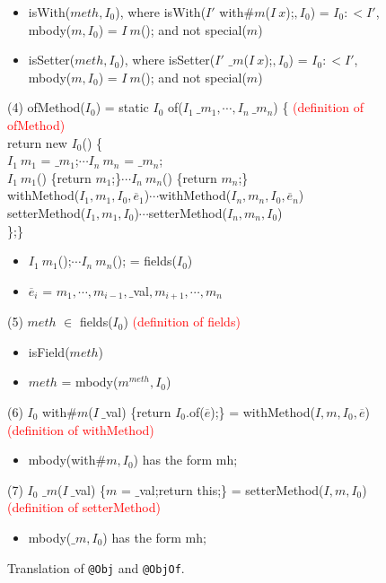 \begin{figure*}
\begin{itemize}
    \item \textsf{isWith(}$meth,I_0$\textsf{)}, where \textsf{isWith(}$I'$ \textsf{with}$\#m$\textsf{(}$I\ x$\textsf{);}$,I_0$\textsf{)} = $I_0 :< I'$, \textsf{mbody(}$m,I_0$\textsf{)} = $I\ m$\textsf{();} and not \textsf{special(}$m$\textsf{)}
    \item \textsf{isSetter(}$meth,I_0$\textsf{)}, where \textsf{isSetter(}$I'$ $\_m$\textsf{(}$I\ x$\textsf{);}$,I_0$\textsf{)} = $I_0 :< I'$, \textsf{mbody(}$m,I_0$\textsf{)} = $I\ m$\textsf{();} and not \textsf{special(}$m$\textsf{)}
    \end{itemize}
(4) \textsf{ofMethod(}$I_0$\textsf{)} = \textsf{static }$I_0$\textsf{ of(}$I_1\ \_m_1,\cdots,I_n\ \_m_n$\textsf{) \{} \textcolor{red}{(definition of ofMethod)}
    \\ \textsf{return new }$I_0$\textsf{() \{}
    \\ $I_1\ m_1$ = $\_m_1$\textsf{;}$\cdots I_n\ m_n$ = $\_m_n$\textsf{;}
    \\ $I_1\ m_1$\textsf{() \{return }$m_1$\textsf{;\}}$\cdots I_n\ m_n$\textsf{() \{return }$m_n$\textsf{;\}}
    \\ \textsf{withMethod(}$I_1,m_1,I_0,\overline{e}_1$\textsf{)}$\cdots$\textsf{withMethod(}$I_n,m_n,I_0,\overline{e}_n$\textsf{)}
    \\ \textsf{setterMethod(}$I_1,m_1,I_0$\textsf{)}$\cdots$\textsf{setterMethod(}$I_n,m_n,I_0$\textsf{)}
    \\ \textsf{\};\}}
    \begin{itemize}
    \item $I_1\ m_1$\textsf{();}$\cdots I_n\ m_n$\textsf{();} = \textsf{fields(}$I_0$\textsf{)}
    \item $\overline{e}_i$ = $m_1,\cdots,m_{i-1},\_$\textsf{val}$,m_{i+1},\cdots,m_n$
    \end{itemize}
(5) $meth$ $\in$ \textsf{fields(}$I_0$\textsf{)} \textcolor{red}{(definition of fields)}
    \begin{itemize}
    \item \textsf{isField(}$meth$\textsf{)}
    \item $meth$ = \textsf{mbody(}$m^{meth},I_0$\textsf{)}
    \end{itemize}
(6) $I_0$ \textsf{with}$\#m$\textsf{(}$I\ \_$\textsf{val) \{return }$I_0$\textsf{.of(}$\overline{e}$\textsf{);\}} = \textsf{withMethod(}$I,m,I_0,\overline{e}$\textsf{)} \textcolor{red}{(definition of withMethod)}
    \begin{itemize}
    \item \textsf{mbody(with}$\#m,I_0$\textsf{)} has the form \textsf{mh;}
    \end{itemize}
(7) $I_0$ $\_m$\textsf{(}$I\ \_$\textsf{val) \{}$m$ = $\_$\textsf{val;return this;\}} = \textsf{setterMethod(}$I,m,I_0$\textsf{)} \textcolor{red}{(definition of setterMethod)}
    \begin{itemize}
    \item \textsf{mbody(}$\_m,I_0$\textsf{)} has the form \textsf{mh;}
    \end{itemize}
\caption{Translation of \lstinline{@Obj} and \lstinline{@ObjOf}.}
\label{fig:trans2}
\end{figure*}

